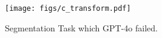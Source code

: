 \vspace{-2pt}
\begin{figure}
    
    \centering
    \texttt{[image: figs/c\_transform.pdf]}
    \vspace{-7pt}
    \caption{Segmentation Task which GPT-4o failed.
    }
    \label{fig:segmentation}
    \vspace{-10pt}
\end{figure}